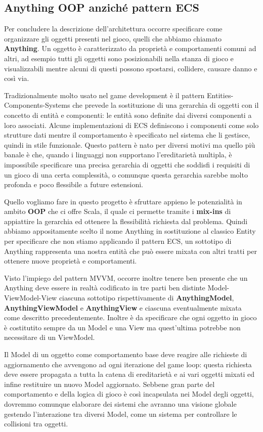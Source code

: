 \subsection{Anything OOP anziché pattern ECS}
Per concludere la descrizione dell'architettura occorre specificare come organizzare gli oggetti presenti nel gioco, quelli che abbiamo chiamato \textbf{Anything}.
Un oggetto è caratterizzato da proprietà e comportamenti comuni ad altri, ad esempio tutti gli oggetti sono posizionabili nella stanza di gioco e visualizzabili mentre alcuni di questi possono spostarsi, collidere, causare danno e così via.

Tradizionalmente molto usato nel game development è il pattern Entities-Components-Systems che prevede la sostituzione di una gerarchia di oggetti con il concetto di entità e componenti: le entità sono definite dai diversi componenti a loro associati. 
Alcune implementazioni di ECS definiscono i componenti come solo strutture dati mentre il comportamento è specificato nel sistema che li gestisce, quindi in stile funzionale. 
Questo pattern è nato per diversi motivi ma quello più banale è che, quando i linguaggi non supportano l'ereditarietà multipla, è impossibile specificare una precisa gerarchia di oggetti che soddisfi i requisiti di un gioco di una certa complessità, o comunque questa gerarchia sarebbe molto profonda e poco flessibile a future estensioni.

Quello vogliamo fare in questo progetto è sfruttare appieno le potenzialità in ambito \textbf{OOP} che ci offre Scala, il quale ci permette tramite i \textbf{mix-ins} di appiattire la gerarchia ed ottenere la flessibilità richiesta dal problema.
Quindi abbiamo appositamente scelto il nome Anything in sostituzione al classico Entity per specificare che non stiamo applicando il pattern ECS, un sottotipo di Anything rappresenta una nostra entità che può essere mixata con altri tratti per ottenere nuove proprietà e comportamenti. 

Visto l'impiego del pattern MVVM, occorre inoltre tenere ben presente che un Anything deve essere in realtà codificato in tre parti ben distinte Model-ViewModel-View ciascuna sottotipo rispettivamente di \textbf{AnythingModel}, \textbf{AnythingViewModel} e \textbf{AnythingView} e ciascuna eventualmente mixata come descritto precedentemente. 
Inoltre è da specificare che ogni oggetto in gioco è costitutito sempre da un Model e una View ma quest'ultima potrebbe non necessitare di un ViewModel.

Il Model di un oggetto come comportamento base deve reagire alle richieste di aggiornamento che avvengono ad ogni iterazione del game loop: questa richiesta deve essere propagata a tutta la catena di ereditarietà e ai vari oggetti mixati ed infine restituire un nuovo Model aggiornato.
Sebbene gran parte del comportamento e della logica di gioco è così incapsulata nei Model degli oggetti, dovremmo comunque elaborare dei sistemi che avranno una visione globale gestendo l'interazione tra diversi Model, come un sistema per controllare le collisioni tra oggetti.

